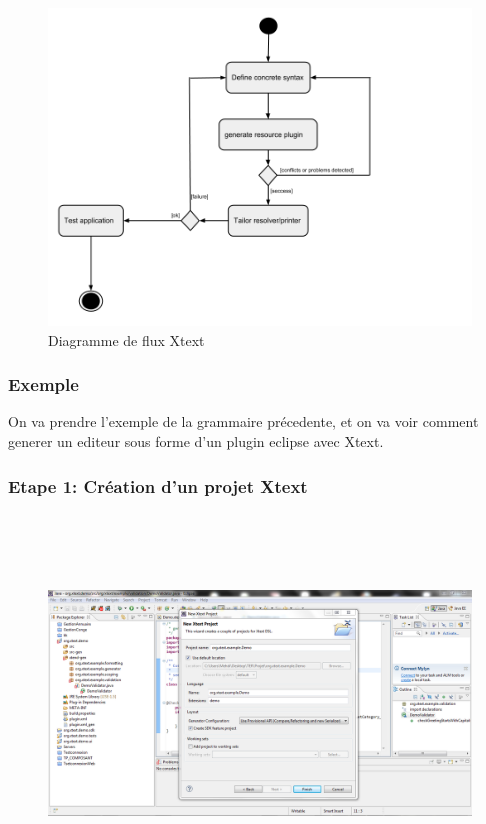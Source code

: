 \documentclass{article}
\begin{document}
\begin{figure}[h]
	\centering
		\includegraphics[width=1.10\textwidth]{DiagrammeFluxXtext.png}
	\caption{Diagramme de flux Xtext}
	\label{fig:DiagrammeFluxXtext}
\end{figure}\FloatBarrier

\subsubsection{Exemple}
On va prendre l'exemple de la grammaire précedente, et on va voir comment generer un editeur sous forme d'un plugin eclipse avec Xtext.
\subsubsection{Etape 1: Création d'un projet Xtext}


\begin{figure}[h]
	\centering
		\includegraphics[width=1.10\textwidth,height=10cm]{1.PNG}
	\label{fig:1}
\end{figure}\FloatBarrier
\end{document}
